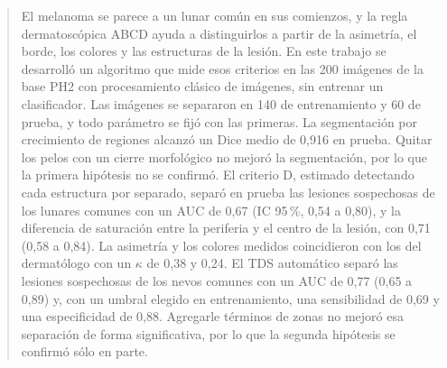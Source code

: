 \begin{abstract}
El melanoma se parece a un lunar común en sus comienzos, y la regla dermatoscópica ABCD ayuda a distinguirlos a partir de la asimetría, el borde, los colores y las estructuras de la lesión. En este trabajo se desarrolló un algoritmo que mide esos criterios en las 200 imágenes de la base PH2 con procesamiento clásico de imágenes, sin entrenar un clasificador. Las imágenes se separaron en 140 de entrenamiento y 60 de prueba, y todo parámetro se fijó con las primeras. La segmentación por crecimiento de regiones alcanzó un Dice medio de 0,916 en prueba. Quitar los pelos con un cierre morfológico no mejoró la segmentación, por lo que la primera hipótesis no se confirmó. El criterio D, estimado detectando cada estructura por separado, separó en prueba las lesiones sospechosas de los lunares comunes con un AUC de 0,67 (IC 95\,\%, 0,54 a 0,80), y la diferencia de saturación entre la periferia y el centro de la lesión, con 0,71 (0,58 a 0,84). La asimetría y los colores medidos coincidieron con los del dermatólogo con un $\kappa$ de 0,38 y 0,24.
El TDS automático separó las lesiones sospechosas de los nevos comunes con un AUC de 0,77 (0,65 a 0,89) y, con un umbral elegido en entrenamiento, una sensibilidad de 0,69 y una especificidad de 0,88. Agregarle términos de zonas no mejoró esa separación de forma significativa, por lo que la segunda hipótesis se confirmó sólo en parte.
\end{abstract}
